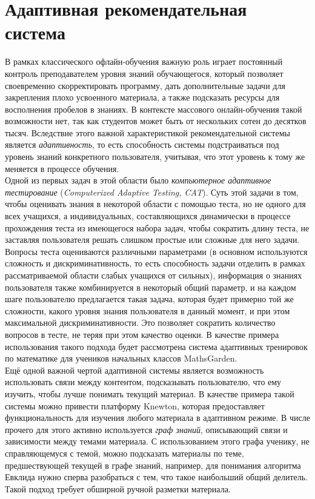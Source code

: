 \documentclass[14pt]{matmex-diploma}
\begin{document}
\section{Адаптивная рекомендательная система}
\indent В рамках классического офлайн-обучения важную роль играет постоянный контроль преподавателем уровня знаний обучающегося, который позволяет своевременно скорректировать программу, дать дополнительные задачи для закрепления плохо усвоенного материала, а также подсказать ресурсы для восполнения пробелов в знаниях. В контексте массового онлайн-обучения такой возможности нет, так как студентов может быть от нескольких сотен до десятков тысяч. Вследствие этого важной характеристикой рекомендательной системы является \textit{адаптивность}, то есть способность системы подстраиваться под уровень знаний конкретного пользователя, учитывая, что этот уровень к тому же меняется в процессе обучения.
\\\indent Одной из первых задач в этой области было \textit{компьютерное адаптивное тестирование} (\textit{Computerized Adaptive Testing, CAT})\cite{CAT}. Суть этой задачи в том, чтобы оценивать знания в некоторой области с помощью теста, но не одного для всех учащихся, а индивидуальных, составляющихся динамически в процессе прохождения теста из имеющегося набора задач, чтобы сократить длину теста, не заставляя пользователя решать слишком простые или сложные для него задачи. Вопросы теста оцениваются различными параметрами (в основном используются сложность и дискриминативность, то есть способность задачи отделить в рамках рассматриваемой области слабых учащихся от сильных), информация о знаниях пользователя также комбинируется в некоторый общий параметр, и на каждом шаге пользователю предлагается такая задача, которая будет примерно той же сложности, какого уровня знания пользователя в данный момент, и при этом максимальной дискриминативности. Это позволяет сократить количество вопросов в тесте, не теряя при этом качество оценки. В качестве примера использования такого подхода будет рассмотрена система адаптивных тренировок по математике для учеников начальных классов MathsGarden\cite{mathsgarden}.
\\\indent Ещё одной важной чертой адаптивной системы является возможность использовать связи между контентом, подсказывать пользователю, что ему изучить, чтобы лучше понимать текущий материал. В качестве примера такой системы можно привести платформу Knewton\cite{knewton_paper}, которая предоставляет функциональность для изучения любого материала в адаптивном режиме. В числе прочего для этого активно используется \textit{граф знаний}, описывающий связи и зависимости между темами материала. С использованием этого графа ученику, не справляющемуся с темой, можно подсказать материалы по теме, предшествующей текущей в графе знаний, например, для понимания алгоритма Евклида нужно сперва разобраться с тем, что такое наибольший общий делитель. Такой подход требует обширной ручной разметки материала.
\end{document}
